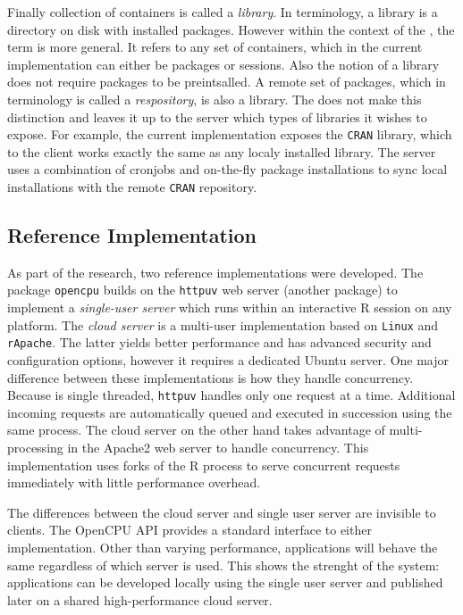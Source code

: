 Finally collection of containers is called a \emph{library}. In \R terminology, a library is a directory on disk with installed packages. However within the context of the \API, the term is more general. It refers to any set of containers, which in the current implementation can either be packages or sessions. Also the \API notion of a library does not require packages to be preintsalled. A remote set of packages, which in \R terminology is called a \emph{respository}, is also a library. The \API does not make this distinction and leaves it up to the server which types of libraries it wishes to expose. For example, the current implementation exposes the \texttt{CRAN} library, which to the client works exactly the same as any localy installed library. The server uses a combination of cronjobs and on-the-fly package installations to sync local installations with the remote \texttt{CRAN} repository. 


\subsection{Reference Implementation}

As part of the research, two reference implementations were developed. The \R package \texttt{opencpu} builds on the \texttt{httpuv} web server (another \R package) to implement a \emph{single-user server} which runs within an interactive R session on any platform. The \emph{cloud server} is a multi-user implementation based on \texttt{Linux} and \texttt{rApache}. The latter yields better performance and has advanced security and configuration options, however it requires a dedicated Ubuntu server. One major difference between these implementations is how they handle concurrency. Because \R is single threaded, \texttt{httpuv} handles only one request at a time. Additional incoming requests are automatically queued and executed in succession using the same process. The cloud server on the other hand takes advantage of multi-processing in the Apache2 web server to handle concurrency. This implementation uses forks of the R process to serve concurrent requests immediately with little performance overhead. 

The differences between the cloud server and single user server are invisible to clients. The OpenCPU API provides a standard interface to either implementation. Other than varying performance, applications will behave the same regardless of which server is used. This shows the strenght of the system: applications can be developed locally using the single user server and published later on a shared high-performance cloud server.

